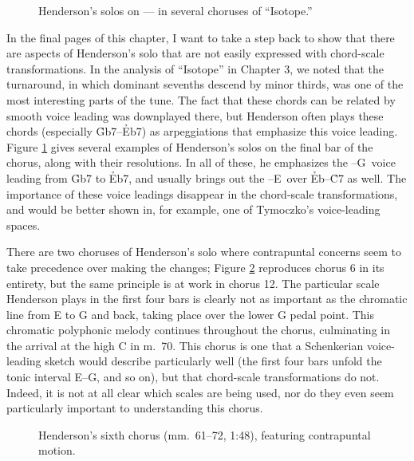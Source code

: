 \begin{figure}[tbp]
  \caption[Henderson's solos on
    \protect\h{Gb7}--\protect\h{Eb7}--\protect\h{C7} in several choruses of
    ``Isotope.'']{Henderson's solos on
    \protect{}--\protect{}--\protect{} in several
    choruses of ``Isotope.''}
  \label{csa:henderson-turnarounds}
\end{figure}

In the final pages of this chapter, I want to take a step back to show that
there are aspects of Henderson's solo that are not easily expressed with
chord-scale transformations. In the analysis of ``Isotope'' in Chapter 3, we
noted that the turnaround, in which dominant sevenths descend by minor thirds,
was one of the most interesting parts of the tune. The fact that these chords
can be related by smooth voice leading was downplayed there, but Henderson
often plays these chords (especially \h{Gb7}--\h{Eb7}) as arpeggiations that
emphasize this voice leading. Figure \ref{csa:henderson-turnarounds} gives
several examples of Henderson's solos on the final bar of the chorus, along
with their resolutions. In all of these, he emphasizes the \Gflat--G\nat\ voice
leading from \h{Gb7} to \h{Eb7}, and usually brings out the \Eflat--E\nat\ over
\h{Eb}--\h{C7} as well. The importance of these voice leadings disappear in
the chord-scale transformations, and would be better shown in, for example, one of
Tymoczko's voice-leading spaces.

There are two choruses of Henderson's solo where contrapuntal concerns seem to
take precedence over making the changes; Figure \ref{csa:contrapuntal-chorus}
reproduces chorus 6 in its entirety, but the same principle is at work in
chorus 12. The particular scale Henderson plays in the first four bars is
clearly not as important as the chromatic line from E to G and back, taking
place over the lower G pedal point. This chromatic polyphonic
melody continues throughout the chorus, culminating in the arrival at the high
C in m.~70. This chorus is one that a Schenkerian voice-leading sketch would
describe particularly well (the first four bars unfold the tonic interval
E--G, and so on), but that chord-scale transformations do not.
Indeed, it is not at all clear which scales are being used, nor do they even
seem particularly important to understanding this chorus.

\begin{figure}[tbp]
  \caption[Henderson's sixth chorus, featuring contrapuntal motion.]{%
    Henderson's sixth chorus (mm.~61--72, 1:48), featuring contrapuntal
    motion.}
  \label{csa:contrapuntal-chorus}
\end{figure}

